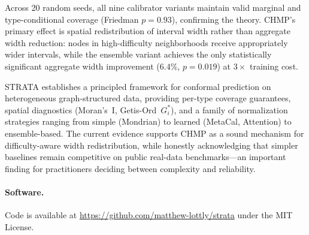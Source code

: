 \documentclass[twoside,11pt]{article}
\begin{document}
Across 20 random seeds, all nine calibrator variants maintain valid marginal
and type-conditional coverage (Friedman $p = 0.93$), confirming the theory.
CHMP's primary effect is spatial redistribution of interval width rather than
aggregate width reduction: nodes in high-difficulty neighborhoods receive
appropriately wider intervals, while the ensemble variant achieves the only
statistically significant aggregate width improvement ($6.4\%$, $p = 0.019$)
at $3\times$ training cost.

STRATA establishes a principled framework for conformal prediction on
heterogeneous graph-structured data, providing per-type coverage guarantees,
spatial diagnostics (Moran's~I, Getis-Ord~$G_i^*$), and a family of
normalization strategies ranging from simple (Mondrian) to learned
(MetaCal, Attention) to ensemble-based. The current evidence supports
CHMP as a sound mechanism for difficulty-aware width redistribution, while
honestly acknowledging that simpler baselines remain competitive on public
real-data benchmarks---an important finding for practitioners deciding
between complexity and reliability.


\paragraph{Software.} Code is available at
\url{https://github.com/matthew-lottly/strata}
under the MIT License.

\end{document}

